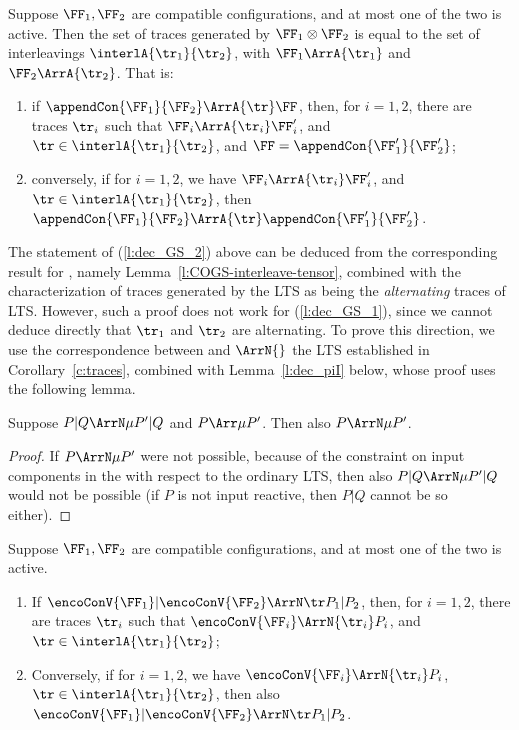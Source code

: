 \begin{lemma}
\label{c:dec_GS}
Suppose $\FF_1,\FF_2$ are compatible \AOGS configurations, and at most one of the two is active.
Then the set of traces generated by $\FF_1 \otimes \FF_2$
is equal to the set of interleavings $\interlA{\tr_1}{\tr_2}$,
with $\FF_1 \ArrA{\tr_1}$ and $\FF_2 \ArrA{\tr_2}$.
That is:
\begin{enumerate}
  \item\label{l:dec_GS_1} if $\appendCon{\FF_1}{\FF_2} \ArrA{\tr} \FF$, 
  then, for $i=1,2$,  there are traces $ \tr_i$
  such that $ {\FF_i} \ArrA{\tr_i} \FF'_i$, 
  and $\tr  \in \interlA{ \tr_1}{\tr_2}$, 
  and $\FF = \appendCon{\FF'_1}{\FF'_2}$;
  \item\label{l:dec_GS_2} conversely, if for $i=1,2$, we have
  $\FF_i \ArrA{ \tr_i} \FF'_i$,  
  and $\tr  \in \interlA {\tr_1}{\tr_2}$, 
  then $\appendCon{\FF_1}{\FF_2} \ArrA{\tr} 
  \appendCon{\FF'_1} {\FF'_2}$.
\end{enumerate}
\end{lemma}  
\noindent
The statement of (\ref{l:dec_GS_2}) above can be deduced from
the corresponding result for \COGS, namely
Lemma~\ref{l:COGS-interleave-tensor},
combined with the characterization
of traces generated by the \AOGS LTS 
as being the \emph{alternating} traces of \COGS LTS.
However, such a proof does not work for (\ref{l:dec_GS_1}),
since we cannot deduce directly that $\tr_1$ and $\tr_2$ are alternating.
To prove this direction,
we use the correspondence between \AOGS and $\ArrN{}$ the \outputpr LTS 
established in Corollary~\ref{c:traces}, 
combined with Lemma~\ref{l:dec_piI} below, whose proof uses  the following lemma.


\begin{lemma}
\label{l:dec_piI_aux}
Suppose $P| Q  \ArrN \mu P'|Q$ and 
$P  \Arr \mu P'$. Then also $P  \ArrN \mu P'$.
\end{lemma} 
\begin{proof}
If $P  \ArrN \mu P'$ were not possible, because of the constraint on input components in
the \opLTS with respect to the ordinary LTS, then also 
$P| Q  \ArrN \mu P'|Q$ would not be possible (if $P$ is not input reactive,  then 
$P|Q$ cannot be so either). 
\end{proof} 


\begin{lemma}
\label{l:dec_piI}
Suppose $\FF_1,\FF_2$ are compatible configurations, and at most one of the two is active.
\begin{enumerate}
\item If $\encoConV {\FF_1} |\encoConV {\FF_2} \ArrN \tr  P_1 | P_2  $, 
  then, for $i=1,2$,  there are traces $ \tr_i $
  such that $\encoConV {\FF_i} \ArrN { \tr_i} P_i $, 
  and $ \tr \in \interlA { \tr_1   }{ \tr_2 }$;
\item
Conversely, if for  $i=1,2$, we have
  $\encoConV {\FF_i} \ArrN { \tr_i} P_i$,
  $\tr \in \interlA { \tr_1   }{ \tr_2 }$, 
  then also 
  $\encoConV {\FF_1} |\encoConV {\FF_2} \ArrN \tr  P_1 | P_2$.
\end{enumerate} 
\end{lemma}  

